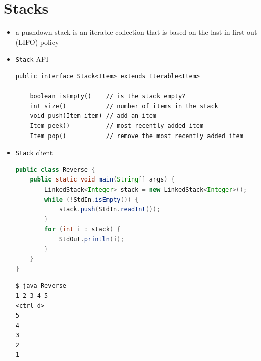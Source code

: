 \documentclass[8pt,a4paper,compress]{beamer}
\begin{document}
\section{Stacks}
\begin{frame}[fragile]
\begin{itemize}
\item a pushdown stack is an iterable collection that is based on the last-in-first-out (LIFO) policy

\item \lstinline{Stack} API
\begin{lstlisting}[language={}]
public interface Stack<Item> extends Iterable<Item>

    boolean isEmpty()    // is the stack empty?
    int size()           // number of items in the stack
    void push(Item item) // add an item
    Item peek()          // most recently added item
    Item pop()           // remove the most recently added item
\end{lstlisting}

\item \lstinline{Stack} client
\begin{lstlisting}[language=Java]
public class Reverse {
    public static void main(String[] args) {
        LinkedStack<Integer> stack = new LinkedStack<Integer>();
        while (!StdIn.isEmpty()) {
            stack.push(StdIn.readInt());
        }
        for (int i : stack) {
            StdOut.println(i);
        }
    }
}
\end{lstlisting}

\begin{lstlisting}[language={}]
$ java Reverse 
1 2 3 4 5
<ctrl-d>
5
4
3
2
1
\end{lstlisting}
\end{itemize}
\end{frame}
\end{document}
